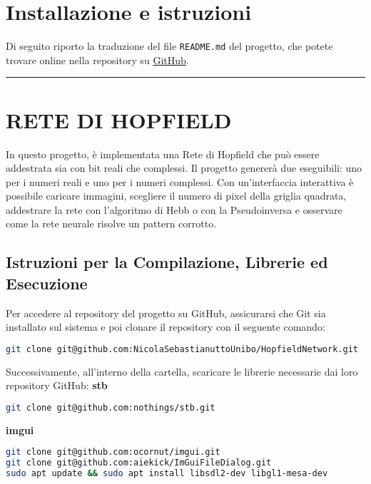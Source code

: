 \documentclass{article}
\begin{document}
\section{Installazione e istruzioni}
Di seguito riporto la traduzione del file \texttt{README.md} del progetto, che potete trovare online nella repository su \href{https://github.com/NicolaSebastianuttoUnibo/HopfieldNetwork}{GitHub}.

\hrule
\vspace{1em}
\section*{RETE DI HOPFIELD}

In questo progetto, è implementata una Rete di Hopfield che può essere addestrata sia con bit reali che complessi. Il progetto genererà due eseguibili: uno per i numeri reali e uno per i numeri complessi. Con un'interfaccia interattiva è possibile caricare immagini, scegliere il numero di pixel della griglia quadrata, addestrare la rete con l'algoritmo di Hebb o con la Pseudoinversa e osservare come la rete neurale risolve un pattern corrotto.

\subsection*{Istruzioni per la Compilazione, Librerie ed Esecuzione}

Per accedere al repository del progetto su GitHub, assicurarsi che Git sia installato sul sistema e poi clonare il repository con il seguente comando:

\begin{lstlisting}[language=bash]
git clone git@github.com:NicolaSebastianuttoUnibo/HopfieldNetwork.git
\end{lstlisting}

Successivamente, all'interno della cartella, scaricare le librerie necessarie dai loro repository GitHub:
\textbf{stb}
\begin{lstlisting}[language=bash]
git clone git@github.com:nothings/stb.git 
\end{lstlisting}

\textbf{imgui}
\begin{lstlisting}[language=bash]
git clone git@github.com:ocornut/imgui.git  
git clone git@github.com:aiekick/ImGuiFileDialog.git
sudo apt update && sudo apt install libsdl2-dev libgl1-mesa-dev  
\end{lstlisting}
\end{document}
